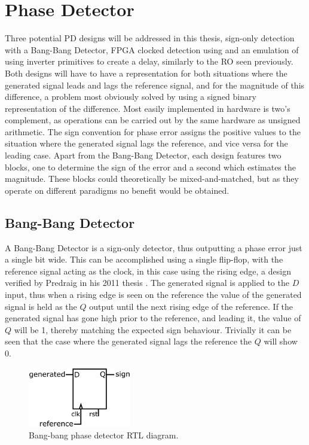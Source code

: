 \section{Phase Detector}
Three potential \acl{PD} designs will be addressed in this thesis, sign-only detection with a Bang-Bang Detector, \ac{FPGA} clocked detection using  and an emulation of  using inverter primitives to create a delay, similarly to the \ac{RO} seen previously. Both designs will have to have a representation for both situations where the generated signal leads and lags the reference signal, and for the magnitude of this difference, a problem most obviously solved by using a signed binary representation of the difference. Most easily implemented in hardware is two's complement, as operations can be carried out by the same hardware as unsigned arithmetic. The sign convention for phase error assigns the positive values to the situation where the generated signal lags the reference, and vice versa for the leading case. Apart from the Bang-Bang Detector, each design features two blocks, one to determine the sign of the error and a second which estimates the magnitude. These blocks could theoretically be mixed-and-matched, but as they operate on different paradigms no benefit would be obtained.

\subsection{Bang-Bang Detector}
A Bang-Bang Detector is a sign-only detector, thus outputting a phase error just a single bit wide. This can be accomplished using a single flip-flop, with the reference signal acting as the clock, in this case using the rising edge, a design verified by Predraig in his 2011 thesis \cite{predraig}. The generated signal is applied to the $D$ input, thus when a rising edge is seen on the reference the value of the generated signal is held as the $Q$ output until the next rising edge of the reference. If the generated signal has gone high prior to the reference, and leading it, the value of $Q$ will be 1, thereby matching the expected sign behaviour. Trivially it can be seen that the case where the generated signal lags the reference the $Q$ will show 0.
\begin{figure}[h]
	\centering
	\includegraphics[width=0.4\textwidth]{../BB}
	\caption[Bang-bang phase detector \ac{RTL} diagram]{Bang-bang phase detector \ac{RTL} diagram.}
	\label{fig:bang_bang}
\end{figure}

